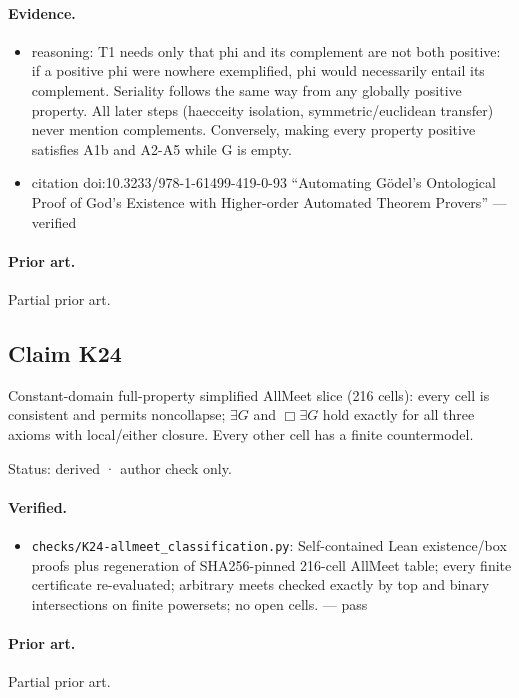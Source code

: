 \documentclass{article}
\begin{document}
\paragraph{Evidence.}
\begin{itemize}
\item reasoning: T1 needs only that phi and its complement are not both positive: if a positive phi were nowhere exemplified, phi would necessarily entail its complement. Seriality follows the same way from any globally positive property. All later steps (haecceity isolation, symmetric/euclidean transfer) never mention complements. Conversely, making every property positive satisfies A1b and A2-A5 while G is empty.
\item citation doi:10.3233/978-1-61499-419-0-93 “Automating Gödel's Ontological Proof of God's Existence with Higher-order Automated Theorem Provers” --- verified
\end{itemize}

\paragraph{Prior art.} Partial prior art.

\subsection*{Claim K24}

Constant-domain full-property simplified AllMeet slice (216 cells): every cell is consistent and permits noncollapse; $\exists G$ and $\Box\exists G$ hold exactly for all three axioms with local/either closure. Every other cell has a finite countermodel.

Status: derived · author check only.

\paragraph{Verified.}
\begin{itemize}
\item \texttt{checks/K24-allmeet\_classification.py}: Self-contained Lean existence/box proofs plus regeneration of SHA256-pinned 216-cell AllMeet table; every finite certificate re-evaluated; arbitrary meets checked exactly by top and binary intersections on finite powersets; no open cells. --- pass
\end{itemize}

\paragraph{Prior art.} Partial prior art.
\end{document}
